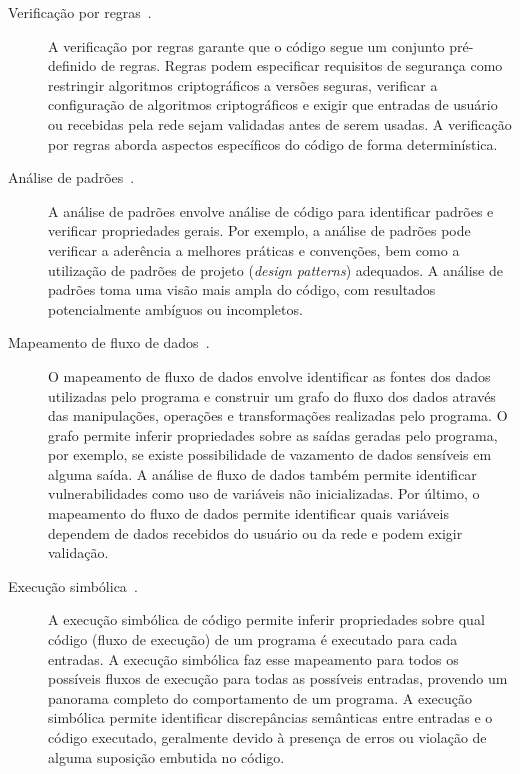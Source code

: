 \begin{description}

  \item[Verificação por regras~\cite{engler01bugs, chen2017efficient}.] A verificação por regras garante que o código segue um conjunto pré-definido de regras. Regras podem especificar requisitos de segurança como restringir algoritmos criptográficos a versões seguras, verificar a configuração de algoritmos criptográficos e exigir que entradas de usuário ou recebidas pela rede sejam validadas antes de serem usadas. A verificação por regras aborda aspectos específicos do código de forma determinística.

  \item[Análise de padrões~\cite{jang12redebug, kim17vuddy}.] A análise de padrões envolve análise de código para identificar padrões e verificar propriedades gerais. Por exemplo, a análise de padrões pode verificar a aderência a melhores práticas e convenções, bem como a utilização de padrões de projeto (\emph{design patterns}) adequados. A análise de padrões toma uma visão mais ampla do código, com resultados potencialmente ambíguos ou incompletos.

  \item[Mapeamento de fluxo de dados~\cite{qin06lift, chang08dataflow}.] O mapeamento de fluxo de dados envolve identificar as fontes dos dados utilizadas pelo programa e construir um grafo do fluxo dos dados através das manipulações, operações e transformações realizadas pelo programa. O grafo permite inferir propriedades sobre as saídas geradas pelo programa, por exemplo, se existe possibilidade de vazamento de dados sensíveis em alguma saída. A análise de fluxo de dados também permite identificar vulnerabilidades como uso de variáveis não inicializadas. Por último, o mapeamento do fluxo de dados permite identificar quais variáveis dependem de dados recebidos do usuário ou da rede e podem exigir validação.

  \item[Execução simbólica~\cite{ramos15symbolic, cadar08klee, avgerinos14exploit}.] A execução simbólica de código permite inferir propriedades sobre qual código (fluxo de execução) de um programa é executado para cada entradas. A execução simbólica faz esse mapeamento para todos os possíveis fluxos de execução para todas as possíveis entradas, provendo um panorama completo do comportamento de um programa. A execução simbólica permite identificar discrepâncias semânticas entre entradas e o código executado, geralmente devido à presença de erros ou violação de alguma suposição embutida no código.

\end{description}

